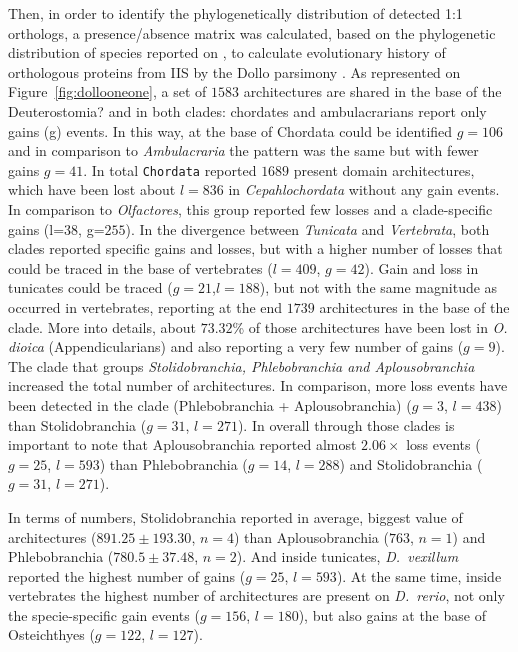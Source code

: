 \documentclass[11pt]{article}
\newcommand{\TODO}[1]{\begingroup\color{red}#1\endgroup}
\begin{document}
Then, in order to identify the phylogenetically distribution of detected 1:1
orthologs, a presence/absence matrix was calculated, based on the phylogenetic
distribution of species reported on \cite{}, to calculate evolutionary history 
of orthologous proteins from IIS by the Dollo parsimony \cite{}.
As represented on Figure~\ref{fig:dollooneone}, a set of $1583$ architectures 
are shared in the base of the \TODO{Deuterostomia?} and in both clades: 
chordates and ambulacrarians report only gains (g) events. In this way, at the 
base of Chordata could be identified $g=106$ and in comparison to \textit{Ambulacraria}
the pattern was the same but with fewer gains $g=41$. In total \texttt{Chordata}
reported $1689$ present domain architectures, which have been lost about
$l=836$ in \textit{Cepahlochordata} without any gain events. In comparison
to \textit{Olfactores}, this group reported few losses and a clade-specific gains 
(l=$38$, g=$255$). In the divergence between \textit{Tunicata} and 
\textit{Vertebrata}, both clades reported specific gains and losses, but with a 
higher number of losses that could be traced in the base of vertebrates 
($l=409$, $g=42$). Gain and loss in tunicates could be traced ($g=21$,$l=188$), but not with
the same magnitude as occurred in vertebrates, reporting at the end $1739$ architectures in
the base of the clade. More into details, about $73.32$\% of those architectures 
have been lost in \textit{O. dioica} (Appendicularians) and also reporting a very 
few number of gains ($g=9$). \TODO{The clade that groups} \textsl{Stolidobranchia, 
Phlebobranchia and Aplousobranchia} increased the total number of architectures. 
In comparison, more loss events have been detected in the clade (Phlebobranchia +
Aplousobranchia) ($g=3$, $l=438$) than Stolidobranchia ($g=31$, $l=271$). In 
overall through those clades is important to note that Aplousobranchia reported 
almost $2.06\times$ loss events ($g=25$, $l=593$) than Phlebobranchia ($g=14$,
$l=288$) and Stolidobranchia ($g=31$, $l=271$).

In terms of numbers, Stolidobranchia reported in average, biggest value of 
architectures ($891.25 \pm 193.30$, $n=4$) than Aplousobranchia 
($763$, $n=1$) and Phlebobranchia ($780.5 \pm 37.48$, $n=2$).
And inside tunicates, \textit{D.\ vexillum} reported the highest number of
gains ($g=25$, $l=593$). At the same time, inside vertebrates the 
highest number of architectures are present on \textit{D.\ rerio}, 
not only the specie-specific gain events ($g=156$, $l=180$), but also 
gains at the base of Osteichthyes ($g=122$, $l=127$). 
\end{document}
